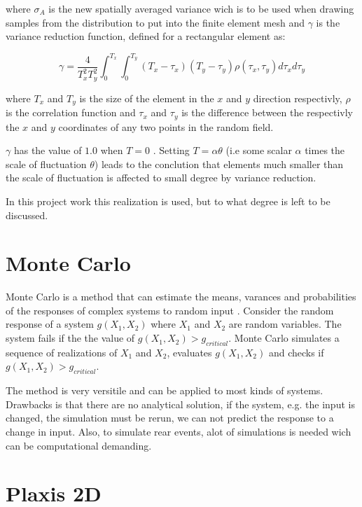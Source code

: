 where $\sigma_A$ is the new spatially averaged variance wich is to be used when drawing samples from the distribution to put into the finite element mesh and $\gamma$ is the variance reduction function, defined for a rectangular element as:

\begin{equation}
\label{eq3.42}
	\gamma = \frac{4}{T_x^2 T_y^2} \int_0^{T_x} \int_0^{T_y} (T_x-\tau_x)(T_y-\tau_y)\rho(\tau_x,\tau_y)d\tau_xd\tau_y
\end{equation}

where $T_x$ and $T_y$ is the size of the element in the $x$ and $y$ direction respectivly, $\rho$ is the correlation function and $\tau_x$ and $\tau_y$ is the difference between the respectivly the $x$ and $y$ coordinates of any two points in the random field.

$\gamma$ has the value of $1.0$ when $T=0$ \citep[see][chapter 3]{fenton2008risk}. Setting \(T=\alpha \theta\) (i.e some scalar $\alpha$ times the scale of fluctuation $\theta$) leads to the conclution that elements much smaller than the scale of fluctuation is affected to small degree by variance reduction.

In this project work this realization is used, but to what degree is left to be discussed.

\section{Monte Carlo}

Monte Carlo is a method that can estimate the means, varances and probabilities of the responses of complex systems to random input \citep[see][chapter 6.6]{fenton2008risk}. 
Consider the random response of a system $g(X_1,X_2)$ where $X_1$ and $X_2$ are random variables. The system fails if the the value of $g(X_1,X_2) > g_{critical}$. Monte Carlo simulates a sequence of realizations of $X_1$ and $X_2$,  evaluates $g(X_1,X_2)$ and checks if $g(X_1,X_2) > g_{critical}$. 

The method is very versitile and can be applied to most kinds of systems. 
Drawbacks is that there are no analytical solution, if the system, e.g. the input is changed, the simulation must be rerun, we can not predict the response to a change in input. 
Also, to simulate rear events, alot of simulations is needed wich can be computational demanding.

\section{Plaxis 2D}

